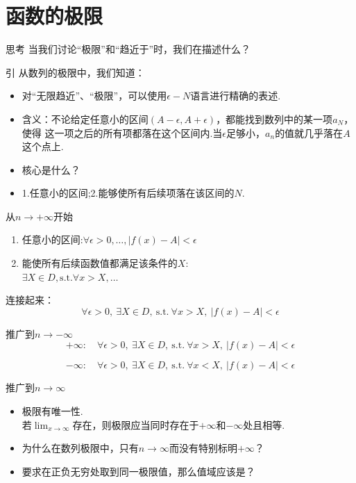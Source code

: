 \documentclass[]{beamer}
\begin{document}
\section{函数的极限}

\begin{frame}{思考}
    当我们讨论“极限”和“趋近于”时，我们在描述什么？
\end{frame}

\begin{frame}{引}
    从数列的极限中，我们知道：
    \begin{itemize}
        \item 对“无限趋近”、“极限”，可以使用$\epsilon-N$语言进行精确的表述.
        \item 含义：不论给定任意小的区间$(A-\epsilon,A+\epsilon)$，都能找到数列中的某一项$a_N$，使得
        这一项之后的所有项都落在这个区间内.当$\epsilon$足够小，$a_n$的值就几乎落在$A$这个点上.
        \item 核心是什么？
        \item 1.任意小的区间;\quad 2.能够使所有后续项落在该区间的$N$.
    \end{itemize}
\end{frame}

\begin{frame}{从$n\rightarrow+\infty$开始}
    \begin{enumerate}
        \item 任意小的区间:$\forall\epsilon>0,\dots,|f(x)-A|<\epsilon$
        \item 能使所有后续函数值都满足该条件的$X$:\\$\exists X\in D,\text{s.t.}\forall x>X,\dots$
    \end{enumerate} 
    连接起来：
    \[
    \forall\epsilon>0,\ \exists X\in D,\ \text{s.t.}\ \forall x>X,\ |f(x)-A|<\epsilon
    \]
\end{frame}

\begin{frame}{推广到$n\rightarrow-\infty$}
    \[
    +\infty:\quad\forall\epsilon>0,\ \exists X\in D,\ \text{s.t.}\ \forall x>X,\ |f(x)-A|<\epsilon
    \]

    \[
    -\infty:\quad\forall\epsilon>0,\ \exists X\in D,\ \text{s.t.}\ \forall x<X,\ |f(x)-A|<\epsilon
    \]
\end{frame}

\begin{frame}{推广到$n\rightarrow\infty$}
    \begin{itemize}
        \item 极限有唯一性.\\
        若$\displaystyle\lim_{x\rightarrow\infty}$存在，则极限应当同时存在于$+\infty$和$-\infty$处且相等.
        \item 为什么在数列极限中，只有$n\rightarrow\infty$而没有特别标明$+\infty$？
        \item 要求在正负无穷处取到同一极限值，那么值域应该是？
    \end{itemize}
\end{frame}
\end{document}
